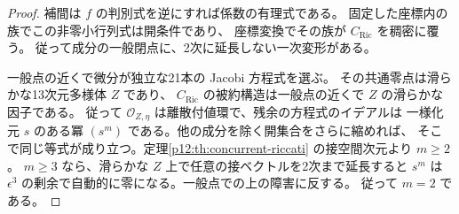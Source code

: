 \begin{proof}
補間は $f$ の判別式を逆にすれば係数の有理式である。
固定した座標内の族でこの非零小行列式は開条件であり、
座標変換でその族が $C_{\mathrm{Ric}}$ を稠密に覆う。
従って成分の一般閉点に、2次に延長しない一次変形がある。

一般点の近くで微分が独立な21本の Jacobi 方程式を選ぶ。
その共通零点は滑らかな13次元多様体 $Z$ であり、
$C_{\mathrm{Ric}}$ の被約構造は一般点の近くで $Z$ の滑らかな因子である。
従って $\mathcal O_{Z,\eta}$ は離散付値環で、残余の方程式のイデアルは
一様化元 $s$ のある冪 $(s^m)$ である。他の成分を除く開集合をさらに縮めれば、
そこで同じ等式が成り立つ。定理\ref{p12:th:concurrent-riccati} の接空間次元より $m\ge2$。
$m\ge3$ なら、滑らかな $Z$ 上で任意の接ベクトルを2次まで延長すると
$s^m$ は $\epsilon^3$ の剰余で自動的に零になる。一般点での上の障害に反する。
従って $m=2$ である。
\end{proof}

